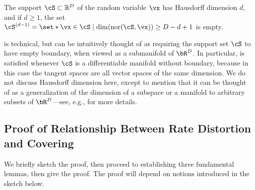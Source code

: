 \documentclass[../../book-main.tex]{subfiles}
\begin{document}
\begin{assumption}\label{assumption:no-boundary}
    The support $\cS \subset \R^D$ of the random variable $\vx$ has Hausdorff
    dimension $d$, and if $d \geq 1$, the set $\cS^{(d-1)} = \set*{\vx \in \cS
    \given \dim(\mathrm{nor}(\cS, \vx)) \geq D-d+1}$ is empty.
\end{assumption}

 is technical, but can be intuitively thought of as
requiring the support set $\cS$ to have empty boundary, when viewed as
a submanifold of $\bR^D$. In particular,  is
satisfied whenever $\cS$ is a differentiable manifold without boundary, because
in this case the tangent spaces are all vector spaces of the same dimension.
We do not discuss Hausdorff dimension here, except to mention that it can be
thought of as a generalization of the dimension of a subspace or a manifold to
arbitrary subsets of $\bR^D$---see, e.g., \cite{Evans1991-pp} for more details.



\subsection{Proof of Relationship Between Rate Distortion and Covering}

We briefly sketch the proof, then proceed to establishing three fundamental
lemmas, then give the proof. The proof will depend on notions introduced in the
sketch below.
\end{document}
